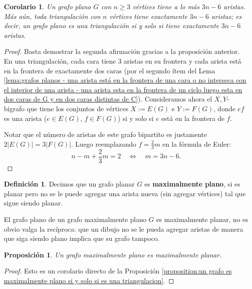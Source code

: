 \documentclass[12pt]{report}
\theoremstyle{plain}
\newtheorem{proposition}[theorem]{Proposición}
\newtheorem{corollary}[theorem]{Corolario}
\theoremstyle{definition}
\newtheorem{definition}[theorem]{Definición}
\newcommand{\abs}[1]{\left \vert #1 \right \vert}
\begin{document}
\begin{corollary}\label{corolario:un grafo plano con n > 2 vertices tiene a lo mas 3n - 6 aristas}
Un grafo plano $G$ con $n \geq 3$ vértices tiene a lo más $3n - 6$ aristas. Más aún, toda triangulación con $n$ vértices tiene exactamente $3n-6$ aristas; es decir, un grafo plano es una triangulación si y solo si tiene exactamente $3n-6$ aristas.
\end{corollary}
\begin{proof}
Basta demostrar la segunda afirmación gracias a la proposición anterior. En una triangulación, cada cara tiene $3$ aristas en su frontera y cada arista está en la frontera de exactamente dos caras (por el segundo ítem del Lema \ref{lema:grafos planos - una arista está en la frontera de una cara o no interseca con el interior de una arista - una arista esta en la frontera de un ciclo luego esta en dos caras de G y en dos caras distintas de C}). Consideramos ahora el $X,Y$-bigrafo que tiene los conjuntos de vértices $X := E(G)$ e $Y := F (G)$, donde $ef$ es una arista ($e \in E(G)$, $f \in F (G)$) si y solo si $e$ está en la frontera de $f$.


Notar que el número de aristas de este grafo bipartito es justamente $2 \abs {E(G)} = 3 \abs{F(G)}$. Luego reemplazando $f = \frac 2 3 m$ en la fórmula de Euler:
\[
    n - m + \frac 2 3 m = 2 \quad \Leftrightarrow \quad m = 3 n - 6.
\]
\end{proof}

\begin{definition}
Decimos que un grafo planar $G$ es \textbf{maximalmente plano}, si es planar pero no se le puede agregar una arista nueva (sin agregar vértices) tal que sigue siendo planar.
\end{definition}

El grafo plano de un grafo maximalmente plano $G$ es maximalmente planar, no es obvio valga la recíproca: que un dibujo no se le pueda agregar aristas de manera que siga siendo plano implica que su grafo tampoco.

\begin{proposition}
Un grafo maximalmente plano es maximalmente planar.
\end{proposition}
\begin{proof}
Esto es un corolario directo de la Proposición \ref{proposition:un grafo es maximalmente plano si y solo si es una triangulacion}.
\end{proof}
\end{document}
